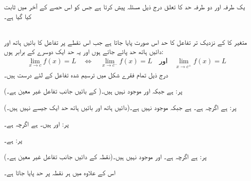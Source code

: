 یک طرفہ اور دو طرفہ حد کا تعلق درج ذیل مسئلہ پیش کرتا ہے جس کو اس حصے کے آخر میں ثابت  کیا گیا ہے۔

\\
متغیر  کا  کے نزدیک تر تفاعل  کا حد اس صورت پایا جاتا ہے جب اس نقطے پر تفاعل کا بائیں ہاتھ اور دائیں ہاتھ حد پائے جاتے ہوں اور یہ حد ایک دوسرے کے برابر ہوں:
\begin{align*}
\lim_{x\to c} f(x)=L\quad \Leftrightarrow\quad \lim_{x\to c^-} f(x)=L \quad \text{اور}\quad \lim_{x\to c^+}f(x)=L
\end{align*} 
درج ذیل تمام فقرے شکل  میں ترسیم شدہ تفاعل کے لئے درست ہیں۔
\begin{description}
\item{ پر:}
 ہے جبکہ   اور  موجود نہیں ہیں۔( کے بائیں جانب تفاعل غیر معین ہے۔)
\item{ پر:}
 ہے اگرچہ  ہے۔ ہے جبکہ  موجود نہیں ہے۔(دائیں ہاتھ اور بائیں ہاتھ حد ایک جیسے نہیں ہیں۔)
\item{ پر:}
 اور   ہیں۔ ہے اگرچہ  ہے۔
\item{ پر:}
 ہے۔
\item{ پر:}
 ہے اگرچہ  ہے۔ اور  موجود نہیں ہیں۔(نقطہ  کے دائیں جانب تفاعل غیر معین ہے۔)
\end{description}
اس کے علاوہ  میں ہر نقطہ  پر  حد  پایا جاتا ہے۔
%
